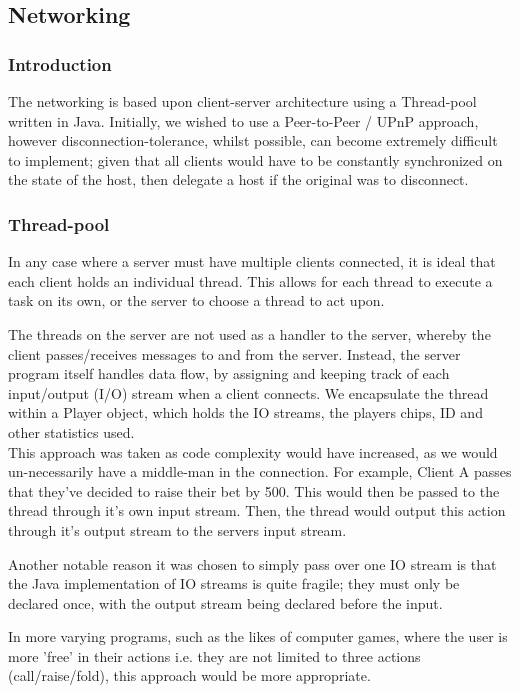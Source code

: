 \documentclass[11pt]{article}
\begin{document}
\subsection{Networking}
\subsubsection{Introduction}
The networking is based upon client-server architecture using a Thread-pool written in Java. Initially, we wished to use a Peer-to-Peer / UPnP approach, however disconnection-tolerance, whilst possible, can become extremely difficult to implement; given that all clients would have to be constantly synchronized on the state of the host, then delegate a host if the original was to disconnect. %

\subsubsection{Thread-pool}
In any case where a server must have multiple clients connected, it is ideal that each client holds an individual thread. This allows for each thread to execute a task on its own, or the server to choose a thread to act upon. %

The threads on the server are not used as a handler to the server, whereby the client passes/receives messages to and from the server. Instead, the server program itself handles data flow, by assigning and keeping track of each input/output (I/O) stream when a client connects. We encapsulate the thread within a Player object, which holds the IO streams, the players chips, ID and other statistics used. \\

This approach was taken as code complexity would have increased, as we would un-necessarily have a middle-man in the connection. For example, Client A passes that they've decided to raise their bet by 500. This would then be passed to the thread through it's own input stream. Then, the thread would output this action through it's output stream to the servers input stream.

Another notable reason it was chosen to simply pass over one IO stream is that the Java implementation of IO streams is quite fragile; they must only be declared once, with the output stream being declared before the input. 

In more varying programs, such as the likes of computer games, where the user is more 'free' in their actions i.e. they are not limited to three actions (call/raise/fold), this approach would be more appropriate. %
\end{document}
